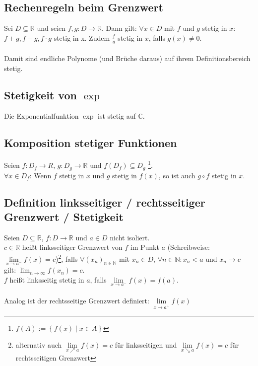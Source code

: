 \documentclass[halfparscip]{scrartcl}
\newcounter{subsection2}
\begin{document}
\subsection{Rechenregeln beim Grenzwert}
Sei $D \subseteq \mathbb{R}$ und seien $f, g: D \rightarrow \mathbb{R}$. Dann gilt:
$\forall x \in D$ mit $f$ und $g$ stetig in $x$: $f + g, f-g, f\cdot g$ stetig in x. Zudem $\frac{f}{g}$ stetig in $x$, falls $g(x) \neq 0$.\\\\
Damit sind endliche Polynome (und Brüche daraus) auf ihrem Definitionsbereich stetig.

\subsection{Stetigkeit von $\exp$}
Die Exponentialfunktion $\exp$ ist stetig auf $\mathbb{C}$.

\subsection{Komposition stetiger Funktionen}
Seien $f: D_f \rightarrow R$, $g : D_g \rightarrow \mathbb{R}$ und $f(D_f) \subseteq D_g$ \footnote{$f(A) := \left\{f(x) \;\vert\; x \in A\right\}$}.\\
$\forall x \in D_f$: Wenn $f$ stetig in $x$ und $g$ stetig in $f(x)$, so ist auch $g \circ f$ stetig in $x$.

\subsection{Definition linksseitiger / rechtsseitiger Grenzwert / Stetigkeit}
Seien $D \subseteq \mathbb{R}$, $f : D \rightarrow \mathbb{R}$ und $a \in D$ nicht isoliert.\\
$c \in \mathbb{R}$ heißt linksseitiger Grenzwert von $f$ im Punkt $a$ (Schreibweise: $\lim\limits_{x \rightarrow a^-} f(x) = c$)\footnote{alternativ auch $\lim\limits_{x \nearrow a} f(x) = c$ für linksseitigen und $\lim\limits_{x \searrow a} f(x) = c$ für rechtsseitigen Grenzwert}, falls $\forall (x_n)_{n \in \mathbb{N}}$ mit $x_n \in D$, $\forall n \in \mathbb{N}: x_n < a$ und $x_n \rightarrow c$ gilt: $\lim_{n \rightarrow \infty} f(x_n) = c$.\\
$f$ heißt linksseitig stetig in $a$, falls $\lim\limits_{x \rightarrow a^-} f(x) = f(a)$.\\\\
Analog ist der rechtsseitige Grenzwert definiert: $\lim\limits_{x \rightarrow a^+} f(x)$
\end{document}
